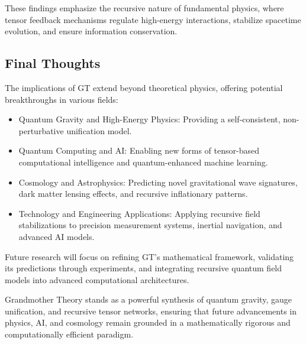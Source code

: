 \documentclass{article}
\theoremstyle{plain}
\begin{document}
These findings emphasize the recursive nature of fundamental physics, where tensor feedback mechanisms regulate high-energy interactions, stabilize spacetime evolution, and ensure information conservation.

\subsection{Final Thoughts}
The implications of GT extend beyond theoretical physics, offering potential breakthroughs in various fields:
\begin{itemize}
    \item Quantum Gravity and High-Energy Physics: Providing a self-consistent, non-perturbative unification model.
    \item Quantum Computing and AI: Enabling new forms of tensor-based computational intelligence and quantum-enhanced machine learning.
    \item Cosmology and Astrophysics: Predicting novel gravitational wave signatures, dark matter lensing effects, and recursive inflationary patterns.
    \item Technology and Engineering Applications: Applying recursive field stabilizations to precision measurement systems, inertial navigation, and advanced AI models.
\end{itemize}

Future research will focus on refining GT’s mathematical framework, validating its predictions through experiments, and integrating recursive quantum field models into advanced computational architectures. 

Grandmother Theory stands as a powerful synthesis of quantum gravity, gauge unification, and recursive tensor networks, ensuring that future advancements in physics, AI, and cosmology remain grounded in a mathematically rigorous and computationally efficient paradigm.

\nocite{*}


\end{document}
